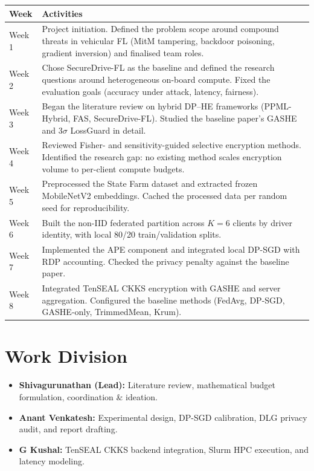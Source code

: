 \documentclass[acmtog,nonacm]{acmart}
\begin{document}
\begin{strip}
\small
\centering
\begin{tabular}{@{}l p{}@{}}
\toprule
\textbf{Week} & \textbf{Activities} \\
\midrule
Week 1 & Project initiation. Defined the problem scope around compound threats in vehicular FL (MitM tampering, backdoor poisoning, gradient inversion) and finalised team roles. \\
Week 2 & Chose SecureDrive-FL as the baseline and defined the research questions around heterogeneous on-board compute. Fixed the evaluation goals (accuracy under attack, latency, fairness). \\
Week 3 & Began the literature review on hybrid DP--HE frameworks (PPML-Hybrid, FAS, SecureDrive-FL). Studied the baseline paper's GASHE and $3\sigma$ LossGuard in detail. \\
Week 4 & Reviewed Fisher- and sensitivity-guided selective encryption methods. Identified the research gap: no existing method scales encryption volume to per-client compute budgets. \\
Week 5 & Preprocessed the State Farm dataset and extracted frozen MobileNetV2 embeddings. Cached the processed data per random seed for reproducibility. \\
Week 6 & Built the non-IID federated partition across $K=6$ clients by driver identity, with local 80/20 train/validation splits. \\
Week 7 & Implemented the APE component and integrated local DP-SGD with RDP accounting. Checked the privacy penalty against the baseline paper. \\
Week 8 & Integrated TenSEAL CKKS encryption with GASHE and server aggregation. Configured the baseline methods (FedAvg, DP-SGD, GASHE-only, TrimmedMean, Krum). \\
\bottomrule
\end{tabular}
\end{strip}

\section{Work Division}
\label{sec:work-division}
\begin{itemize}
    \item \textbf{Shivagurunathan (Lead):} Literature review, mathematical budget formulation, coordination \& ideation.
    \item \textbf{Anant Venkatesh:} Experimental design, DP-SGD calibration, DLG privacy audit, and report drafting.
    \item \textbf{G Kushal:} TenSEAL CKKS backend integration, Slurm HPC execution, and latency modeling.
\end{itemize}
\end{document}
